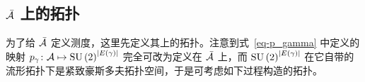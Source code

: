 


		\subsection{\texorpdfstring{$\bar{\mathcal{A}}$ 上的拓扑}{量子位型空间上的拓扑}}

			为了给 $\bar{\mathcal{A}}$ 定义测度，这里先定义其上的拓扑。注意到式~\eqref{eq-p_gamma} 中定义的映射 $p_\gamma \colon \mathcal{A} \mapsto \mathrm{SU}\left(2\right)^{\abs{E(\gamma)}}$ 完全可改为定义在 $\bar{\mathcal{A}}$ 上，而 $\mathrm{SU}\left(2\right)^{\abs{E(\gamma)}}$ 在它自带的流形拓扑下是紧致豪斯多夫拓扑空间，于是可考虑如下过程构造的拓扑\cite{Thiemann2007}。

